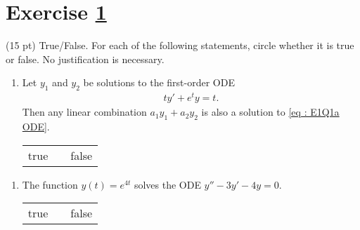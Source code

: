%
%
%
%


\section{Exercise \ref{sec : Math211 Summer2019 Exam1 Q1}}
\label{sec : Math211 Summer2019 Exam1 Q1}

(15 pt) True/False. For each of the following statements, circle whether it is true or false. No justification is necessary.
\begin{enumerate}[label=(\alph*)]
\item\label{itm : E1Q1a} Let $y_{1}$ and $y_{2}$ be solutions to the first-order ODE
\begin{align}
t y' + e^{t} y
=
t.%
\label{eq : E1Q1a ODE}
\end{align}
Then any linear combination $a_{1} y_{1} + a_{2} y_{2}$ is also a solution to \eqref{eq : E1Q1a ODE}.
\begin{center}
\begin{tabular}{c c c}
true	&	\hspace{1in}	&	false
\end{tabular}
\end{center}
\end{enumerate}


\begin{enumerate}[resume,label=(\alph*)]
\item\label{itm : E1Q1b} The function $y(t) = e^{4 t}$ solves the ODE $y'' - 3 y' - 4 y = 0$.
\begin{center}
\begin{tabular}{c c c}
true	&	\hspace{1in}	&	false
\end{tabular}
\end{center}
\end{enumerate}

